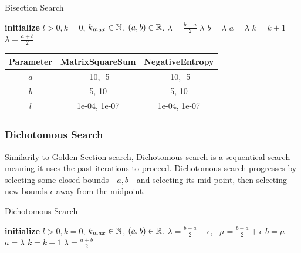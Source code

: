 \documentclass[a4paper,english,titlepage,12pt]{article}
\newcommand{\abs}[1]{\ensuremath|#1|}
\newcommand{\R}{\ensuremath\mathbb{R}}
\newcommand{\N}{\ensuremath\mathbb{N}}
\begin{document}
\begin{algorithm}[H]
\caption{Bisection Search}
\label{alg_bisection}
\begin{algorithmic}[1]
\STATE \textbf{initialize} $l > 0, k = 0$, $k_{max} \in \N$, $(a, b) \in \R$.
\WHILE{$\abs{b - a} > l$ \AND $k < k_{max}$}
    \STATE $\lambda = \frac{b + a}{2}$
        \RETURN $\lambda$
        \STATE $b = \lambda$
    \ELSE
        \STATE $a = \lambda$
    \ENDIF
    \STATE $k = k + 1$
\ENDWHILE
\RETURN $\lambda = \frac{a + b}{2}$
\end{algorithmic}
\end{algorithm}

\begin{table}[H]
\label{tab:params_BisectionSearch}
\centering
{}
\begin{tabular}{|c|c|c|}
\hline
\rowcolor{gray!25}
Parameter & MatrixSquareSum & NegativeEntropy \\
\hline
$a$ & -10, -5 & -10, -5 \\
$b$ & 5, 10 & 5, 10 \\
$l$ & 1e-04, 1e-07 & 1e-04, 1e-07 \\
\hline
\end{tabular}
\end{table}


\subsubsection{Dichotomous Search}


Similarily to Golden Section search, Dichotomous search is a sequentical search meaning it uses the past iterations to proceed. Dichotomous search progresses by selecting some closed bounds $[a, b]$ and selecting its mid-point, then selecting new bounds $\epsilon$ away from the midpoint. \cite{book:nonlinear_programming}

\begin{algorithm}[H]
\caption{Dichotomous Search}
\label{alg_dichotomous}
\begin{algorithmic}[1]
\STATE \textbf{initialize} $l > 0, k = 0$, $k_{max} \in \N$, $(a, b) \in \R$.
    \STATE $\lambda = \frac{b + a}{2} - \epsilon$, \ $\mu = \frac{b + a}{2} + \epsilon$
    \IF{$\theta(\lambda) < \theta(\mu)$}
        \STATE $b = \mu$
    \ELSE
        \STATE $a = \lambda$
    \ENDIF
    \STATE $k = k + 1$
\ENDWHILE
\RETURN $\lambda = \frac{a + b}{2}$
\end{algorithmic}
\end{algorithm}
\end{document}
